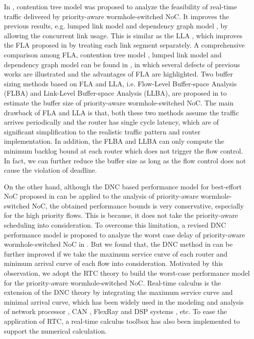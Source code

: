 \documentclass[10pt,journal]{IEEEtran}
\begin{document}
In \cite{LuJS05}, contention tree model was proposed to analyze the feasibility of real-time traffic delivered by priority-aware wormhole-switched NoC. It improves the previous results, e.g. lumped link model \cite{707545} and dependency graph model \cite{708526}, by allowing the concurrent link usage. This is similar as the LLA \cite{73}, which improves the FLA proposed in \cite{Shi:2008:RCA:1397757.1397996} by treating each link segment separately. A comprehensive comparison among FLA, contention tree model \cite{LuJS05}, lumped link model \cite{707545} and dependency graph model \cite{708526} can be found in \cite{Shi2009}, in which several defects of previous works \cite{LuJS05}\cite{707545}\cite{708526} are illustrated and the advantages of FLA are highlighted. Two buffer sizing methods based on FLA and LLA, i.e. Flow-Level Buffer-space Analysis (FLBA) and Link-Level Buffer-space Analysis (LLBA), are proposed in \cite{189} to estimate the buffer size of priority-aware wormhole-switched NoC. The main drawback of FLA and LLA is that, both these two methods assume the traffic arrives periodically and the router has single cycle latency, which are of significant simplification to the realistic traffic pattern and router implementation. In addition, the FLBA and LLBA can only compute the minimum backlog bound at each router which does not trigger the flow control. In fact, we can further reduce the buffer size as long as the flow control does not cause the violation of deadline.

On the other hand, although the DNC based performance model for best-effort NoC proposed in \cite{qian2009analysis} can be applied to the analysis of priority-aware wormhole-switched NoC, the obtained performance bounds is very conservative, especially for the high priority flows. This is because, it does not take the priority-aware scheduling into consideration. To overcome this limitation, a revised DNC performance model is proposed to analyze the worst case delay of priority-aware wormhole-switched NoC in \cite{Qian489900}. But we found that, the DNC method in \cite{Qian489900} can be further improved if we take the maximum service curve of each router and minimum arrival curve of each flow into consideration. Motivated by this observation, we adopt the RTC theory \cite{1253607} to build the worst-case performance model for the priority-aware wormhole-switched NoC. Real-time calculus is the extension of the DNC theory \cite{Boudec2001Network} by integrating the maximum service curve and minimal arrival curve, which has been widely used in the modeling and analysis of network processor \cite{1253838}, CAN \cite{4617308}, FlexRay \cite{Hagiescu:2007:PAF:1278480.1278554} and DSP systems \cite{thiele2005performance}, etc. To ease the application of RTC, a real-time calculus toolbox \cite{rtc} has also been implemented to support the numerical calculation.
\end{document}
